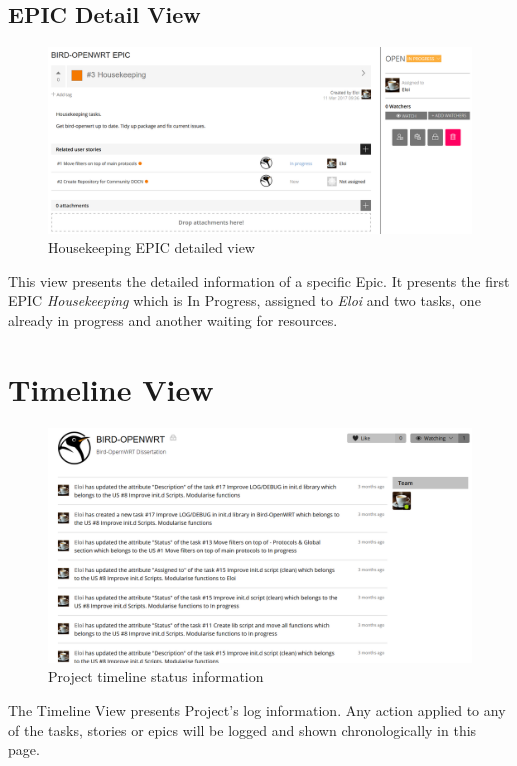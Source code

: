 \begin{appendices}
\begin{landscape}
\subsection{EPIC Detail View}
\begin{figure}[h!]
\centering
    \includegraphics[width=0.85\hsize]{images/kanban/epic-details}
    \caption{Housekeeping EPIC detailed view}
    \label{fig:kepicd}
\end{figure}
This view presents the detailed information of a specific Epic. It presents the first EPIC \textit{Housekeeping} which is In Progress, assigned to \textit{Eloi} and two tasks, one already in progress and another waiting for resources.
\newpage

\section{Timeline View}
\begin{figure}[h!]
\centering
    \includegraphics[width=0.7\hsize]{images/kanban/timeline}
    \caption{Project timeline status information}
    \label{fig:ktimeline}
\end{figure}
The Timeline View presents Project's log information. Any action applied to any of the tasks, stories or epics will be logged and shown chronologically in this page.
\newpage


\end{landscape}
\end{appendices}
